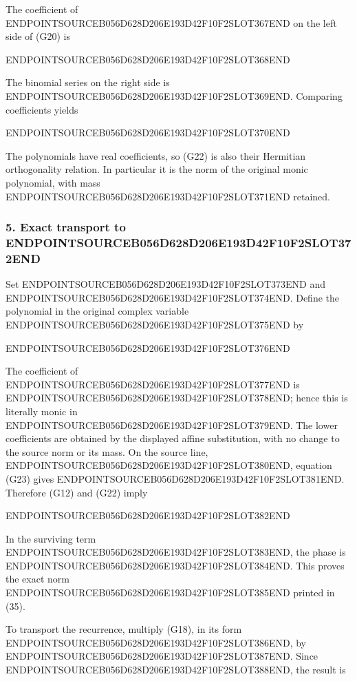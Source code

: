 The coefficient of ENDPOINTSOURCEB056D628D206E193D42F10F2SLOT367END on the left side of (G20) is

ENDPOINTSOURCEB056D628D206E193D42F10F2SLOT368END

The binomial series on the right side is ENDPOINTSOURCEB056D628D206E193D42F10F2SLOT369END. Comparing coefficients yields

ENDPOINTSOURCEB056D628D206E193D42F10F2SLOT370END

The polynomials have real coefficients, so (G22) is also their Hermitian orthogonality relation. In particular it is the norm of the original monic polynomial, with mass ENDPOINTSOURCEB056D628D206E193D42F10F2SLOT371END retained.

\subsubsection{\texorpdfstring{5. Exact transport to ENDPOINTSOURCEB056D628D206E193D42F10F2SLOT372END}{5. Exact transport to }}\label{endpoint-gamma_review--exact-transport-to-sk2ix}

Set ENDPOINTSOURCEB056D628D206E193D42F10F2SLOT373END and ENDPOINTSOURCEB056D628D206E193D42F10F2SLOT374END. Define the polynomial in the original complex variable ENDPOINTSOURCEB056D628D206E193D42F10F2SLOT375END by

ENDPOINTSOURCEB056D628D206E193D42F10F2SLOT376END

The coefficient of ENDPOINTSOURCEB056D628D206E193D42F10F2SLOT377END is ENDPOINTSOURCEB056D628D206E193D42F10F2SLOT378END; hence this is literally monic in ENDPOINTSOURCEB056D628D206E193D42F10F2SLOT379END. The lower coefficients are obtained by the displayed affine substitution, with no change to the source norm or its mass. On the source line, ENDPOINTSOURCEB056D628D206E193D42F10F2SLOT380END, equation (G23) gives ENDPOINTSOURCEB056D628D206E193D42F10F2SLOT381END. Therefore (G12) and (G22) imply

ENDPOINTSOURCEB056D628D206E193D42F10F2SLOT382END

In the surviving term ENDPOINTSOURCEB056D628D206E193D42F10F2SLOT383END, the phase is ENDPOINTSOURCEB056D628D206E193D42F10F2SLOT384END. This proves the exact norm ENDPOINTSOURCEB056D628D206E193D42F10F2SLOT385END printed in (35).

To transport the recurrence, multiply (G18), in its form ENDPOINTSOURCEB056D628D206E193D42F10F2SLOT386END, by ENDPOINTSOURCEB056D628D206E193D42F10F2SLOT387END. Since ENDPOINTSOURCEB056D628D206E193D42F10F2SLOT388END, the result is

